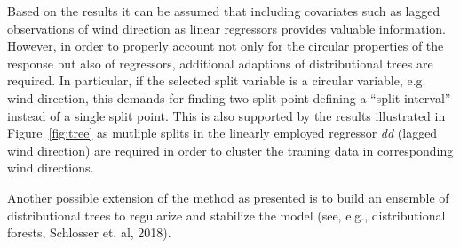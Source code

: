 \documentclass[twoside]{report}
\begin{document}
Based on the results it can be assumed that including covariates such as lagged observations of 
wind direction as linear regressors provides valuable information. 
However, in order to properly account not only for the circular properties of the response but 
also of regressors, additional adaptions of distributional trees are required. In particular, 
if the selected split variable is a circular variable, e.g. wind direction, this demands for finding
two split point defining a ``split interval'' instead of a single split point.
This is also supported by the results illustrated in Figure~\ref{fig:tree} as mutliple splits in 
the linearly employed regressor \textit{dd} (lagged wind direction) are required in order to 
cluster the training data in corresponding wind directions.  


Another possible extension of the method as presented is to build an ensemble of 
distributional trees to regularize and stabilize the model 
(see, e.g., distributional forests, Schlosser et. al, 2018). 



\bigskip



\end{document}

